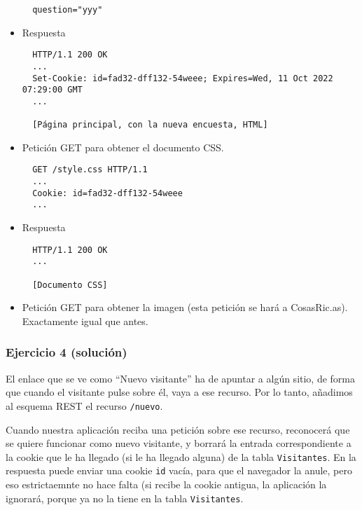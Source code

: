 \begin{itemize}
\begin{verbatim}
  question="yyy"
\end{verbatim}

\item Respuesta

\begin{verbatim}
  HTTP/1.1 200 OK
  ...
  Set-Cookie: id=fad32-dff132-54weee; Expires=Wed, 11 Oct 2022 07:29:00 GMT
  ...

  [Página principal, con la nueva encuesta, HTML]
\end{verbatim}

\item Petición GET para obtener el documento CSS.

\begin{verbatim}
  GET /style.css HTTP/1.1
  ...
  Cookie: id=fad32-dff132-54weee
  ...
\end{verbatim}

\item Respuesta

\begin{verbatim}
  HTTP/1.1 200 OK
  ...

  [Documento CSS]
\end{verbatim}

\item Petición GET para obtener la imagen (esta petición se hará a CosasRic.as). Exactamente igual que antes.

\end{itemize}



\subsubsection{Ejercicio 4 (solución)}

El enlace que se ve como ``Nuevo visitante'' ha de apuntar a algún sitio, de forma que cuando el visitante pulse sobre él, vaya a ese recurso. Por lo tanto, añadimos al esquema REST el recurso \texttt{/nuevo}.

Cuando nuestra aplicación reciba una petición sobre ese recurso, reconocerá que se quiere funcionar como nuevo visitante, y borrará la entrada correspondiente a la cookie que le ha llegado (si le ha llegado alguna) de la tabla \texttt{Visitantes}. En la respuesta puede enviar una cookie \texttt{id} vacía, para que el navegador la anule, pero eso estrictaemnte no hace falta (si recibe la cookie antigua, la aplicación la ignorará, porque ya no la tiene en la tabla \texttt{Visitantes}.

